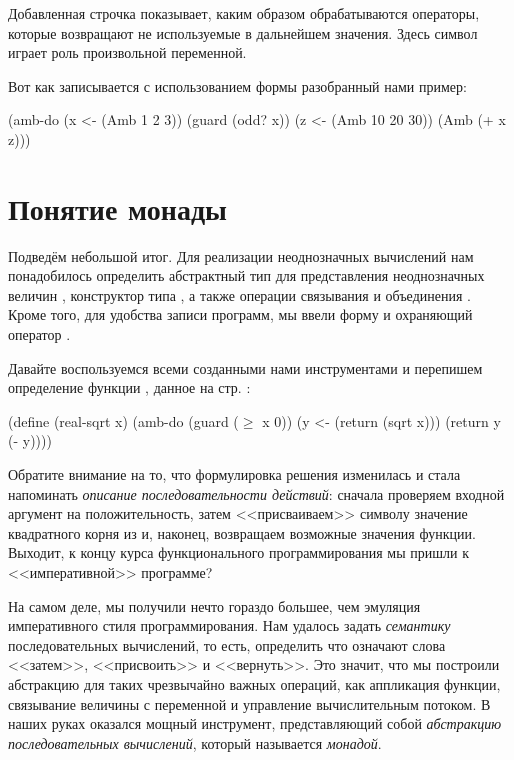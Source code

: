 Добавленная строчка показывает, каким образом обрабатываются операторы, которые возвращают не используемые в дальнейшем значения. Здесь символ \s{_} играет роль произвольной переменной.

Вот как записывается с использованием формы  разобранный нами пример:

\begin{SchemeCode}
(amb-do (x <- (Amb 1 2 3))
    (guard (odd? x))
    (z <- (Amb 10 20 30))
    (Amb (+ x z)))
\end{SchemeCode}


\section[2]{Понятие монады}%
Подведём небольшой итог. Для реализации неоднозначных вычислений нам понадобилось определить абстрактный тип для представления неоднозначных величин , конструктор типа , а также операции связывания  и объединения . Кроме того, для удобства записи программ, мы ввели форму  и охраняющий оператор .

Давайте воспользуемся всеми созданными нами инструментами и перепишем определение функции , данное на стр. \pageref{real-sqrt}:
\begin{Definition}[emph={x,y}]
(define (real-sqrt x)
  (amb-do (guard ($\ge$ x 0))
      (y <- (return (sqrt x)))
      (return y (- y))))
\end{Definition}

Обратите внимание на то, что формулировка решения изменилась и стала напоминать \emph{описание последовательности действий}: сначала проверяем входной аргумент  на положительность, затем <<присваиваем>> символу  значение квадратного корня из  и, наконец, возвращаем возможные значения функции. Выходит, к концу курса функционального программирования мы  пришли к <<императивной>> программе? 

На самом деле, мы получили нечто гораздо большее, чем эмуляция императивного стиля программирования. Нам удалось задать \emph{семантику} последовательных вычислений, то есть, определить что означают слова <<затем>>, <<присвоить>> и <<вернуть>>. Это значит, что мы построили абстракцию для таких чрезвычайно важных операций, как  аппликация функции, связывание величины с переменной и управление вычислительным потоком. В наших руках оказался мощный инструмент, представляющий собой \emph{абстракцию последовательных вычислений}, который называется \emph{монадой}. 

